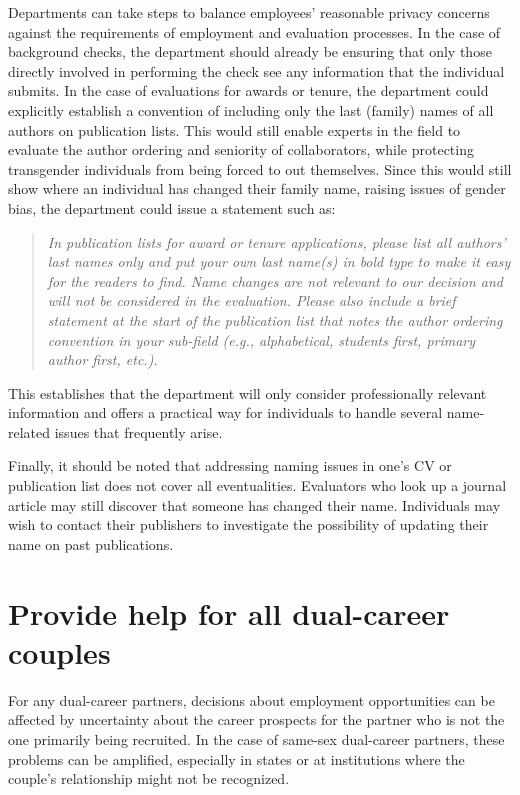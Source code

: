 Departments can take steps to balance employees' reasonable privacy concerns against the requirements of employment and evaluation processes. In the case of background checks, the department should already be ensuring that only those directly involved in performing the check see any information that the individual submits. In the case of evaluations for awards or tenure, the department could explicitly establish a convention of including only the last (family) names of all authors on publication lists. This would still enable experts in the field to evaluate the author ordering and seniority of collaborators, while protecting transgender individuals from being forced to out themselves. Since this would still show where an individual has changed their family name, raising issues of gender bias, the department could issue a statement such as:
\begin{quote}
	\emph{In publication lists for award or tenure applications, please list all authors' last names only and put your own last name(s) in bold type to make it easy for the readers to find. {Name changes are not relevant to our decision and will not be considered in the evaluation}. Please also include a brief statement at the start of the publication list that notes the author ordering convention in your sub-field (e.g., alphabetical, students first, primary author first, etc.).}
\end{quote}
This establishes that the department will only consider professionally relevant information and offers a practical way for individuals to handle several name-related issues that frequently arise.

Finally, it should be noted that addressing naming issues in one's CV or publication list does not cover all eventualities. Evaluators who look up a journal article may still discover that someone has changed their name. Individuals may wish to contact their publishers to investigate the possibility of updating their name on past publications.



\section {Provide help for all dual-career couples}
\label{dual-career}
For any dual-career partners, decisions about employment opportunities can be affected by uncertainty about the career prospects for the partner who is not the one primarily being recruited. In the case of same-sex dual-career partners, these problems can be amplified, especially in states or at institutions where the couple's relationship might not be recognized.  

